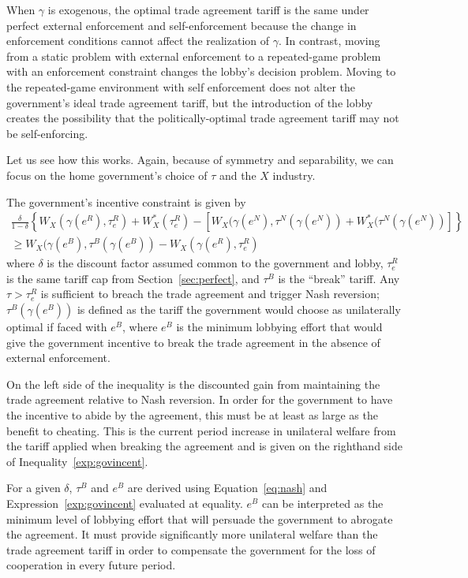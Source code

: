 \documentclass[12pt,titlepage]{article}
\newcommand{\ga}{\gamma}
\newcommand{\de}{\delta}
\begin{document}
When $\ga$ is exogenous, the optimal trade agreement tariff is the same under perfect external enforcement and self-enforcement because the change in enforcement conditions cannot affect the realization of $\ga$. In contrast, moving from a static problem with external enforcement to a repeated-game problem with an enforcement constraint changes the lobby's decision problem. Moving to the repeated-game environment with self enforcement does not alter the government's ideal trade agreement tariff, but the introduction of the lobby creates the possibility that the politically-optimal trade agreement tariff may not be self-enforcing.

Let us see how this works. Again, because of symmetry and separability, we can focus on the home government's choice of $\tau$ and the $X$ industry.

The government's incentive constraint is given by
  \begin{multline}
    \frac{\de}{1-\de} \left\{W_X(\ga(e^R),\tau_e^R) + W_X^*(\tau_e^R) - \left[W_X(\ga(e^N),\tau^N(\ga(e^N)) + W_X^*(\tau^N(\ga(e^N)) \right] \right\} \\ \geq W_X(\ga(e^B),\tau^B(\ga(e^B)) - W_X(\ga(e^R),\tau_e^R)
		\label{exp:govincent}
  \end{multline}
where $\de$ is the discount factor assumed common to the government and lobby, $\tau_e^R$ is the same tariff cap from Section~\ref{sec:perfect}, and $\tau^B$ is the ``break'' tariff. Any $\tau > \tau_e^R$ is sufficient to breach the trade agreement and trigger Nash reversion; $\tau^B(\ga(e^B))$ is defined as the tariff the government would choose as unilaterally optimal if faced with $e^B$, where $e^B$ is the minimum lobbying effort that would give the government incentive to break the trade agreement in the absence of external enforcement.

On the left side of the inequality is the discounted gain from maintaining the trade agreement relative to Nash reversion. In order for the government to have the incentive to abide by the agreement, this must be at least as large as the benefit to cheating. This is the current period increase in unilateral welfare from the tariff applied when breaking the agreement and is given on the righthand side of Inequality~\ref{exp:govincent}.

For a given $\de$, $\tau^B$ and $e^B$ are derived using Equation~\ref{eq:nash} and Expression~\ref{exp:govincent} evaluated at equality. $e^B$ can be interpreted as the minimum level of lobbying effort that will persuade the government to abrogate the agreement. It must provide significantly more unilateral welfare than the trade agreement tariff in order to compensate the government for the loss of cooperation in every future period.
\end{document}
